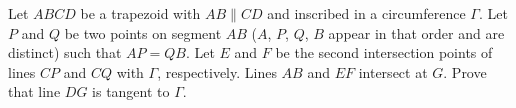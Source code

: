 Let $ABCD$ be a trapezoid with $AB\parallel CD$ and inscribed in a circumference $\Gamma$. Let $P$ and $Q$ be two points on segment $AB$ ($A$,  $P$,  $Q$,  $B$ appear in that order and are distinct) such that $AP=QB$. Let $E$ and $F$ be the second intersection points of lines $CP$ and $CQ$ with $\Gamma$,  respectively. Lines $AB$ and $EF$ intersect at $G$. Prove that line $DG$ is tangent to $\Gamma$.